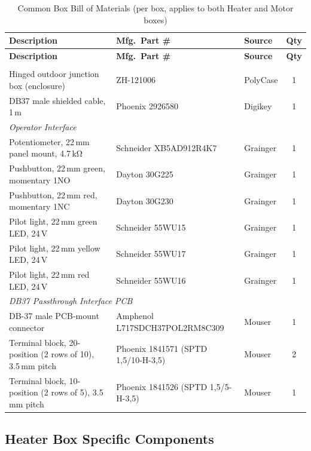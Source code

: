 \documentclass[main.tex]{subfiles}
\begin{document}
\renewcommand{\arraystretch}{1.3}
\begin{longtable}{p{6.5cm} l l c}
\caption{Common Box Bill of Materials (per box, applies to both Heater and Motor boxes)} \label{tab:bom-common} \\
\hline
\textbf{Description} & \textbf{Mfg.\ Part \#} & \textbf{Source} & \textbf{Qty} \\
\hline
\endfirsthead
\hline
\textbf{Description} & \textbf{Mfg.\ Part \#} & \textbf{Source} & \textbf{Qty} \\
\hline
\endhead
\hline
\endfoot

\multicolumn{4}{l}{\textit{Enclosure and Cabling}} \\
\hline
Hinged outdoor junction box (enclosure) & ZH-121006 & PolyCase & 1 \\
DB37 male shielded cable, 1\,m & Phoenix 2926580 & Digikey & 1 \\
\hline

\multicolumn{4}{l}{\textit{Operator Interface}} \\
\hline
Potentiometer, 22\,mm panel mount, 4.7\,k\si{\ohm} & Schneider XB5AD912R4K7 & Grainger & 1 \\
Pushbutton, 22\,mm green, momentary 1NO & Dayton 30G225 & Grainger & 1 \\
Pushbutton, 22\,mm red, momentary 1NC & Dayton 30G230 & Grainger & 1 \\
Pilot light, 22\,mm green LED, 24\,V & Schneider 55WU15 & Grainger & 1 \\
Pilot light, 22\,mm yellow LED, 24\,V & Schneider 55WU17 & Grainger & 1 \\
Pilot light, 22\,mm red LED, 24\,V & Schneider 55WU16 & Grainger & 1 \\
\hline

\multicolumn{4}{l}{\textit{DB37 Passthrough Interface PCB}} \\
\hline
DB-37 male PCB-mount connector & Amphenol L717SDCH37POL2RM8C309 & Mouser & 1 \\
Terminal block, 20-position (2 rows of 10), 3.5\,mm pitch & Phoenix 1841571 (SPTD 1,5/10-H-3,5) & Mouser & 2 \\
Terminal block, 10-position (2 rows of 5), 3.5\,mm pitch & Phoenix 1841526 (SPTD 1,5/5-H-3,5) & Mouser & 1 \\

\end{longtable}
\renewcommand{\arraystretch}{1}

\subsection{Heater Box Specific Components}
\label{sec:bom-heater-specific}
\end{document}
